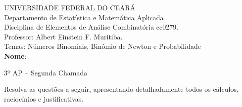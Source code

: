 \documentclass[a4paper,12pt]{article}  %
\begin{document}
\thispagestyle{empty}

UNIVERSIDADE FEDERAL DO CEARÁ\\
Departamento de Estatística e Matemática Aplicada\\
Disciplina de Elementos de Análise Combinatória cc0279.\\
Professor: Albert Einstein F. Muritiba.\\
Temas: Números Binomiais, Binômio de Newton e Probabilidade\\[0.2cm]
\textbf{Nome}: \makebox[380pt]{\hrulefill} \vspace{2pt}
\begin{center}
	3º AP -- Segunda Chamada
\end{center}
Resolva as questões a seguir, apresentando detalhadamente todos os cálculos, raciocínios e justificativas.
\end{document}
